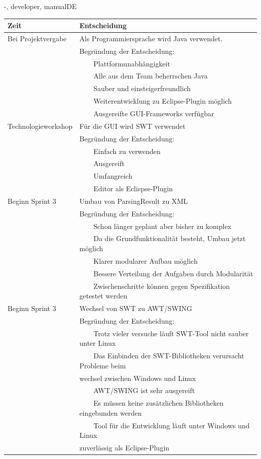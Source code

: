 \documentclass[twoside]{report}
\newcommand{\tabitem}{~~\llap{\textbullet}~~}
\begin{document}
\begin{shownto}{-, developer, manualDE}

\begin{table}[H]
\centering
\begin{tabular}{|l|l|}
\toprule
Zeit & Entscheidung \\
\midrule
Bei Projektvergabe & Als Programmiersprache wird Java verwendet.\\
& Begründung der Entscheidung:\\
&      \tabitem Plattformunabhängigkeit\\
&      \tabitem Alle aus dem Team beherrschen Java\\
&      \tabitem Sauber und einsteigerfreundlich\\
&      \tabitem Weiterentwicklung zu Eclipse-Plugin möglich\\
&      \tabitem Ausgereifte GUI-Frameworks verfügbar\\
\midrule
Technologieworkshop & Für die GUI wird SWT verwendet\\
& Begründung der Entscheidung:\\
&      \tabitem Einfach zu verwenden\\
&	   \tabitem Ausgereift\\
&	   \tabitem Umfangreich\\
&	   \tabitem Editor als Eclispse-Plugin\\
\midrule
Beginn Sprint 3 & Umbau von ParsingResult zu XML\\
& Begründung der Entscheidung:\\
&	   \tabitem Schon länger geplant aber bisher zu komplex\\
&	   \tabitem Da die Grundfunktionalität besteht, Umbau jetzt möglich\\
&	   \tabitem Klarer modularer Aufbau möglich\\
&	   \tabitem Bessere Verteilung der Aufgaben durch Modularität\\
&	   \tabitem Zwischenschritte können gegen Spezifikation getestet werden\\
\midrule
Beginn Sprint 3 & Wechsel von SWT zu AWT/SWING\\
& Begründung der Entscheidung:\\
&	   \tabitem Trotz vieler versuche läuft SWT-Tool nicht sauber unter Linux\\
&	   \tabitem Das Einbinden der SWT-Bibliotheken verursacht Probleme beim \\ &  wechsel zwischen Windows und Linux\\
&	   \tabitem AWT/SWING ist sehr ausgereift\\
&	   \tabitem Es müssen keine zusätzlichen Bibliotheken eingebunden werden\\
&	   \tabitem Tool für die Entwicklung läuft unter Windows und Linux \\ & zuverlässig als Eclipse-Plugin\\
\bottomrule
\end{tabular}
\end{table}
\nsecend



\end{shownto}
\end{document}
